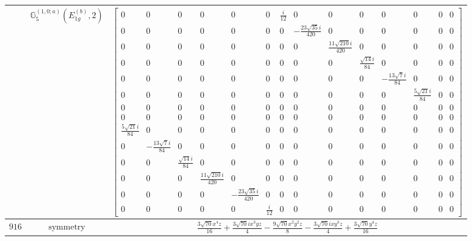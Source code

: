 \documentclass[fleqn,8pt,landscape]{jsarticle}
\begin{document}
\begin{longtable}{ccc}
$  $ & $ \mathbb{G}_{5}^{(1,0;a)}(E_{1g}^{(b)},2) $ & $ \begin{bmatrix} 0 & 0 & 0 & 0 & 0 & 0 & \frac{i}{12} & 0 & 0 & 0 & 0 & 0 & 0 & 0 \\ 0 & 0 & 0 & 0 & 0 & 0 & 0 & - \frac{23 \sqrt{35} i}{420} & 0 & 0 & 0 & 0 & 0 & 0 \\ 0 & 0 & 0 & 0 & 0 & 0 & 0 & 0 & \frac{11 \sqrt{210} i}{420} & 0 & 0 & 0 & 0 & 0 \\ 0 & 0 & 0 & 0 & 0 & 0 & 0 & 0 & 0 & \frac{\sqrt{14} i}{84} & 0 & 0 & 0 & 0 \\ 0 & 0 & 0 & 0 & 0 & 0 & 0 & 0 & 0 & 0 & - \frac{13 \sqrt{7} i}{84} & 0 & 0 & 0 \\ 0 & 0 & 0 & 0 & 0 & 0 & 0 & 0 & 0 & 0 & 0 & \frac{5 \sqrt{21} i}{84} & 0 & 0 \\ 0 & 0 & 0 & 0 & 0 & 0 & 0 & 0 & 0 & 0 & 0 & 0 & 0 & 0 \\ 0 & 0 & 0 & 0 & 0 & 0 & 0 & 0 & 0 & 0 & 0 & 0 & 0 & 0 \\ \frac{5 \sqrt{21} i}{84} & 0 & 0 & 0 & 0 & 0 & 0 & 0 & 0 & 0 & 0 & 0 & 0 & 0 \\ 0 & - \frac{13 \sqrt{7} i}{84} & 0 & 0 & 0 & 0 & 0 & 0 & 0 & 0 & 0 & 0 & 0 & 0 \\ 0 & 0 & \frac{\sqrt{14} i}{84} & 0 & 0 & 0 & 0 & 0 & 0 & 0 & 0 & 0 & 0 & 0 \\ 0 & 0 & 0 & \frac{11 \sqrt{210} i}{420} & 0 & 0 & 0 & 0 & 0 & 0 & 0 & 0 & 0 & 0 \\ 0 & 0 & 0 & 0 & - \frac{23 \sqrt{35} i}{420} & 0 & 0 & 0 & 0 & 0 & 0 & 0 & 0 & 0 \\ 0 & 0 & 0 & 0 & 0 & \frac{i}{12} & 0 & 0 & 0 & 0 & 0 & 0 & 0 & 0 \end{bmatrix} $ \\ \hline
$ 916 $ & $ \text{symmetry} $ & $ \frac{3 \sqrt{70} x^{4} z}{16} + \frac{3 \sqrt{70} i x^{3} y z}{4} - \frac{9 \sqrt{70} x^{2} y^{2} z}{8} - \frac{3 \sqrt{70} i x y^{3} z}{4} + \frac{3 \sqrt{70} y^{4} z}{16} $ \\

\end{longtable}
\end{document}
